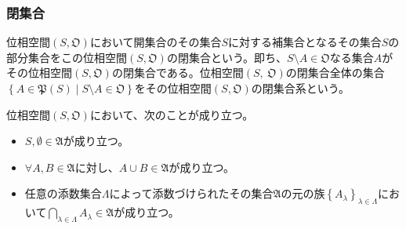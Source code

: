 \documentclass[dvipdfmx]{jsarticle}
\begin{document}
\subsubsection{閉集合}%
\begin{dfn}
位相空間$(S,\mathfrak{O})$において開集合のその集合$S$に対する補集合となるその集合$S$の部分集合をこの位相空間$\left( S,\mathfrak{O} \right)$の閉集合という。即ち、$S \setminus A \in \mathfrak{O}$なる集合$A$がその位相空間$\left( S,\mathfrak{O} \right)$の閉集合である。位相空間$(S,\ \mathfrak{O})$の閉集合全体の集合$\left\{ A \in \mathfrak{P}(S) \middle| S \setminus A \in \mathfrak{O} \right\}$をその位相空間$(S,\mathfrak{O})$の閉集合系という。
\end{dfn}
\begin{thm}\label{8.1.1.4}
位相空間$\left( S,\mathfrak{O} \right)$において、次のことが成り立つ。
\begin{itemize}
\item
  $S,\emptyset \in \mathfrak{A}$が成り立つ。
\item
  $\forall A,B \in \mathfrak{A}$に対し、$A \cup B \in \mathfrak{A}$が成り立つ。
\item
  任意の添数集合$\varLambda$によって添数づけられたその集合$\mathfrak{A}$の元の族$\left\{ A_{\lambda} \right\}_{\lambda \in \varLambda}$において$\bigcap_{\lambda \in \varLambda} A_{\lambda}\in \mathfrak{A}$が成り立つ。
\end{itemize}
\end{thm}
\end{document}
